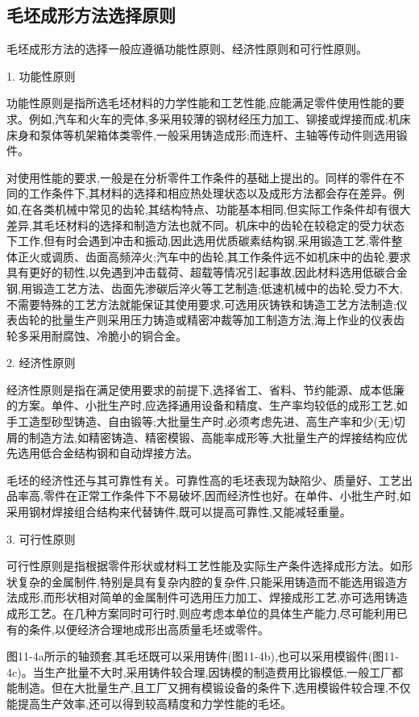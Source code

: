 \documentclass[UTF8]{ctexbook}
\newcommand{\◎}{\ensuremath{\bigcirc}}
\begin{document}
\subsection{毛坯成形方法选择原则}

毛坯成形方法的选择一般应遵循功能性原则、经济性原则和可行性原则。

1. 功能性原则

功能性原则是指所选毛坯材料的力学性能和工艺性能,应能满足零件使用性能的要求。例如,汽车和火车的壳体,多采用较薄的钢材经压力加工、铆接或焊接而成;机床床身和泵体等机架箱体类零件,一般采用铸造成形;而连杆、主轴等传动件则选用锻件。

对使用性能的要求,一般是在分析零件工作条件的基础上提出的。同样的零件在不同的工作条件下,其材料的选择和相应热处理状态以及成形方法都会存在差异。例如,在各类机械中常见的齿轮,其结构特点、功能基本相同,但实际工作条件却有很大差异,其毛坯材料的选择和制造方法也就不同。机床中的齿轮在较稳定的受力状态下工作,但有时会遇到冲击和振动,因此选用优质碳素结构钢,采用锻造工艺,零件整体正火或调质、齿面高频淬火;汽车中的齿轮,其工作条件远不如机床中的齿轮,要求具有更好的韧性,以免遇到冲击载荷、超载等情况引起事故,因此材料选用低碳合金钢,用锻造工艺方法、齿面先渗碳后淬火等工艺制造;低速机械中的齿轮,受力不大,不需要特殊的工艺方法就能保证其使用要求,可选用灰铸铁和铸造工艺方法制造;仪表齿轮的批量生产则采用压力铸造或精密冲裁等加工制造方法,海上作业的仪表齿轮多采用耐腐蚀、冷脆小的铜合金。

2. 经济性原则

经济性原则是指在满足使用要求的前提下,选择省工、省料、节约能源、成本低廉的方案。单件、小批生产时,应选择通用设备和精度、生产率均较低的成形工艺,如手工造型砂型铸造、自由锻等;大批量生产时,必须考虑先进、高生产率和少(无)切屑的制造方法,如精密铸造、精密模锻、高能率成形等,大批量生产的焊接结构应优先选用低合金结构钢和自动焊接方法。

毛坯的经济性还与其可靠性有关。可靠性高的毛坯表现为缺陷少、质量好、工艺出品率高,零件在正常工作条件下不易破坏,因而经济性也好。在单件、小批生产时,如采用钢材焊接组合结构来代替铸件,既可以提高可靠性,又能减轻重量。

3. 可行性原则

可行性原则是指根据零件形状或材料工艺性能及实际生产条件选择成形方法。如形状复杂的金属制件,特别是具有复杂内腔的复杂件,只能采用铸造而不能选用锻造方法成形,而形状相对简单的金属制件可选用压力加工、焊接成形工艺,亦可选用铸造成形工艺。在几种方案同时可行时,则应考虑本单位的具体生产能力,尽可能利用已有的条件,以便经济合理地成形出高质量毛坯或零件。

图11-4a所示的轴颈套,其毛坯既可以采用铸件(图11-4b),也可以采用模锻件(图11-4c)。当生产批量不大时,采用铸件较合理,因铸模的制造费用比锻模低,一般工厂都能制造。但在大批量生产,且工厂又拥有模锻设备的条件下,选用模锻件较合理,不仅能提高生产效率,还可以得到较高精度和力学性能的毛坯。
\end{document}

